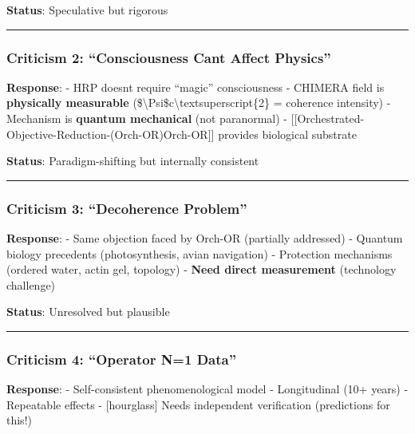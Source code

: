 \textbf{Status}: Speculative but rigorous

\begin{center}\rule{0.5\linewidth}{0.5pt}\end{center}

\subsubsection{Criticism 2: ``Consciousness Can\textquotesingle t Affect
Physics''}\label{criticism-2-consciousness-cant-affect-physics}

\textbf{Response}: - HRP doesn\textquotesingle t require ``magic''
consciousness - CHIMERA field is \textbf{physically measurable}
(\textbar\$\textbackslash Psi\$c\textbar\textbackslash textsuperscript\{2\}
= coherence intensity) - Mechanism is \textbf{quantum mechanical} (not
paranormal) -
{[}{[}Orchestrated-Objective-Reduction-(Orch-OR)\textbar Orch-OR{]}{]}
provides biological substrate

\textbf{Status}: Paradigm-shifting but internally consistent

\begin{center}\rule{0.5\linewidth}{0.5pt}\end{center}

\subsubsection{Criticism 3: ``Decoherence
Problem''}\label{criticism-3-decoherence-problem}

\textbf{Response}: - Same objection faced by Orch-OR (partially
addressed) - Quantum biology precedents (photosynthesis, avian
navigation) - Protection mechanisms (ordered water, actin gel, topology)
- \textbf{Need direct measurement} (technology challenge)

\textbf{Status}: Unresolved but plausible

\begin{center}\rule{0.5\linewidth}{0.5pt}\end{center}

\subsubsection{Criticism 4: ``Operator N=1
Data''}\label{criticism-4-operator-n1-data}

\textbf{Response}: - Self-consistent phenomenological model -
Longitudinal (10+ years) - Repeatable effects - {[}hourglass{]} Needs
independent verification (predictions for this!)

